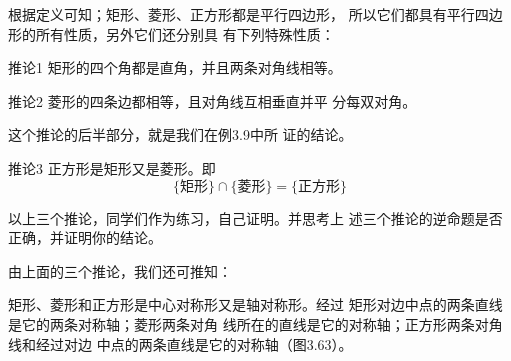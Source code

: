 根据定义可知；矩形、菱形、正方形都是平行四边形，
所以它们都具有平行四边形的所有性质，另外它们还分别具
有下列特殊性质：

\begin{blk}
    {推论1} 矩形的四个角都是直角，并且两条对角线相等。
\end{blk}

\begin{blk}
{推论2} 菱形的四条边都相等，且对角线互相垂直并平
分每双对角。
\end{blk}

这个推论的后半部分，就是我们在例3.9中所
证的结论。

\begin{blk}
    {推论3} 正方形是矩形又是菱形。即
\[\{\text{矩形}\}\cap \{\text{菱形}\}=\{\text{正方形}\}\]
\end{blk}

以上三个推论，同学们作为练习，自己证明。并思考上
述三个推论的逆命题是否正确，并证明你的结论。

由上面的三个推论，我们还可推知：

矩形、菱形和正方形是中心对称形又是轴对称形。经过
矩形对边中点的两条直线是它的两条对称轴；菱形两条对角
线所在的直线是它的对称轴；正方形两条对角线和经过对边
中点的两条直线是它的对称轴（图3.63）。

\begin{figure}[htp]
    \centering
{}
    \caption{}
\end{figure}

